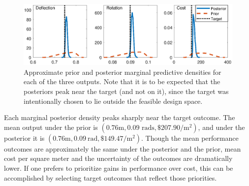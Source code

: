 \documentclass[12pt]{article}
\begin{document}
\begin{figure}[h]
\centering
\includegraphics[scale=0.8]{FIG_prior_vs_posterior_dist}
\caption{Approximate prior and posterior marginal predictive densities for each of the three outputs. Note that it is to be expected that the posteriors peak near the target (and not on it), since the target was intentionally chosen to lie outside the feasible design space.}
\label{fig:prior_post_pred_comp}
\end{figure}
%
Each marginal posterior density peaks sharply near the target outcome.
%
The mean output under the prior is $(0.76\mathrm m,0.09\text{ rads},\$207.90/\mathrm m^2)$, and under the posterior it is $(0.76\mathrm m,0.09\ \mathrm{rad},\$149.47/\mathrm m^2)$.
%
Though the mean performance outcomes are approximately the same under the posterior and the prior, mean cost per square meter and the uncertainty of the outcomes are dramatically lower.
%
If one prefers to prioritize gains in performance over cost, this can be accomplished by selecting target outcomes that reflect those priorities.
\end{document}
